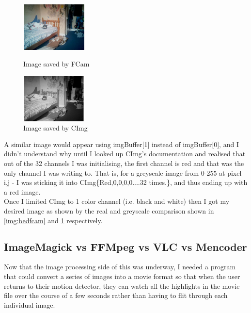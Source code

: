 \documentclass[11pt]{article} %
\begin{document}
\begin{figure}
	\vspace{-200pt}
	\begin{center}
		\includegraphics[width=0.3\textwidth]{../images/realbuffer2}
	\end{center}
	\vspace{-20pt}
	\caption{Image saved by FCam}\label{img:bedfcam}
	\vspace{0pt}
	\begin{center}
		\includegraphics[width=0.3\textwidth]{../images/blackbuffer3}
	\end{center}
	\vspace{-20pt}
	\caption{Image saved by CImg}\label{img:bedcimg}
	\vspace{-10pt}
\end{figure}

A similar image would appear using imgBuffer[1] instead of imgBuffer[0], and I didn't understand why until I looked up CImg's documentation and realised that out of the 32 channels I was initialising, the first channel is red and that was the only channel I was writing to.
That is, for a greyscale image from 0-255 at pixel i,j - I was sticking it into CImg\{Red,0,0,0,0....32 times.\}, and thus ending up with a red image.
\\Once I limited CImg to 1 color channel (i.e. black and white) then I got my desired image as shown by the real and greyscale comparison shown in \cref{img:bedfcam} and \cref{img:bedcimg} respectively.



\subsection{ImageMagick vs FFMpeg vs VLC vs Mencoder}
Now that the image processing side of this was underway, I needed a program that could convert a series of images into a movie format so that when the user returns to their motion detector, they can watch all the highlights in the movie file over the course of a few seconds rather than having to flit through each individual image.\\
\end{document}
